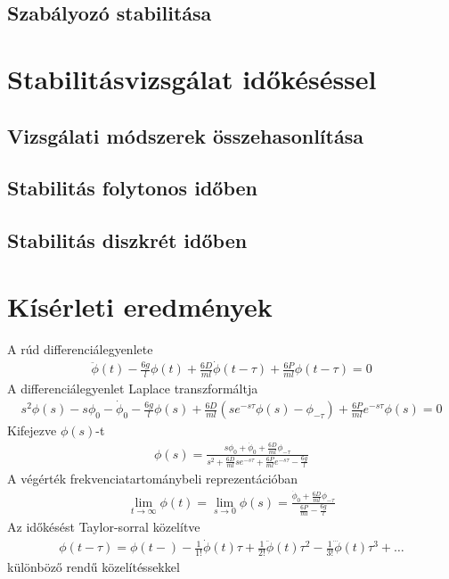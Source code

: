 \section{Szabályozó stabilitása}

\chapter{Stabilitásvizsgálat időkéséssel}\label{chap:time_delay_stability}

\section{Vizsgálati módszerek összehasonlítása}

\section{Stabilitás folytonos időben}

\section{Stabilitás diszkrét időben}

\chapter{Kísérleti eredmények}\label{chap:experimental_results}

\pagebreak
A rúd differenciálegyenlete
\begin{align}
    \ddot\phi\left(t\right) - \frac{6g}{l}\phi\left(t\right) + 
    \frac{6D}{ml}\dot\phi\left(t-\tau\right) + \frac{6P}{ml}\phi\left(t-\tau\right) = 0
\end{align}
A differenciálegyenlet Laplace transzformáltja
\begin{align}
    s^2\phi\left(s\right) - s\phi_0 - \dot\phi_0 - 
    \frac{6g}{l}\phi\left(s\right) + 
    \frac{6D}{ml}\left(se^{-s\tau}\phi\left(s\right)-\phi_{-\tau}\right) + 
    \frac{6P}{ml}e^{-s\tau}\phi\left(s\right) = 0 
\end{align}
Kifejezve $\phi\left(s\right)$-t
\begin{align}
    \phi\left(s\right) = \frac{s\phi_0+\dot\phi_0+\frac{6D}{ml}\phi_{-\tau}}{s^2+\frac{6D}{ml}se^{-s\tau}+\frac{6P}{ml}e^{-s\tau}-\frac{6g}{l}}
\end{align}
A végérték frekvenciatartománybeli reprezentációban
\begin{align}
    \lim_{t \to \infty}\phi\left(t\right) = 
    \lim_{s \to 0} \phi\left(s\right) = 
    \frac{\dot\phi_0+\frac{6D}{ml}\phi_{-\tau}}{\frac{6P}{ml}-\frac{6g}{l}}
\end{align}
Az időkésést Taylor-sorral közelítve
\begin{align}
    \phi\left(t-\tau\right) = \phi\left(t-\right) - 
    \frac{1}{1!}\dot\phi\left(t\right)\tau + 
    \frac{1}{2!}\ddot\phi\left(t\right)\tau^2 - 
    \frac{1}{3!}\dddot\phi\left(t\right)\tau^3 + \ldots
\end{align}
különböző rendű közelítéssekkel

